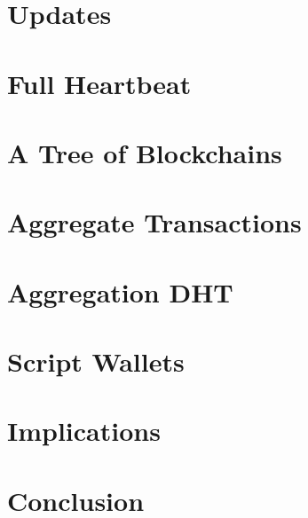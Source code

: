 \documentclass[twocolumn]{article}
\begin{document}
\section{Updates}

\section{Full Heartbeat}

\section{A Tree of Blockchains}

\section{Aggregate Transactions}

\section{Aggregation DHT}

\section{Script Wallets}

\section{Implications}

\section{Conclusion}
\end{document}
